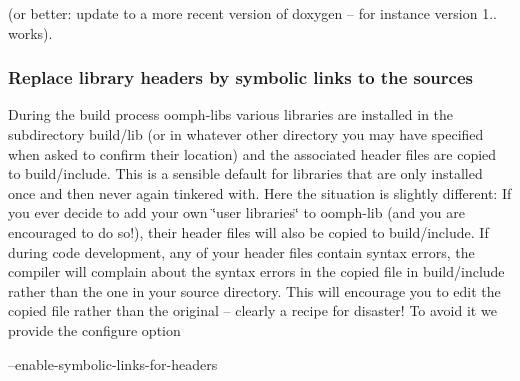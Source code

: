 (or better\+: update to a more recent version of {\ttfamily doxygen} -- for instance version 1.. works).\hypertarget{index_sym_links}{}\subsubsection{Replace library headers by symbolic links to the sources}\label{index_sym_links}
During the build process {\ttfamily oomph-\/lib\textquotesingle{}s} various libraries are installed in the subdirectory {\ttfamily build/lib} (or in whatever other directory you may have specified when asked to confirm their location) and the associated header files are copied to {\ttfamily build/include}. This is a sensible default for libraries that are only installed once and then never again tinkered with. Here the situation is slightly different\+: If you ever decide to add your own \char`\"{}user libraries\char`\"{} to {\ttfamily oomph-\/lib} (and you are encouraged to do so!), their header files will also be copied to {\ttfamily build/include}. If during code development, any of your header files contain syntax errors, the compiler will complain about the syntax errors in the copied file in {\ttfamily build/include} rather than the one in your source directory. This will encourage you to edit the copied file rather than the original -- clearly a recipe for disaster! To avoid it we provide the configure option \begin{DoxyVerb} --enable-symbolic-links-for-headers
\end{DoxyVerb}


